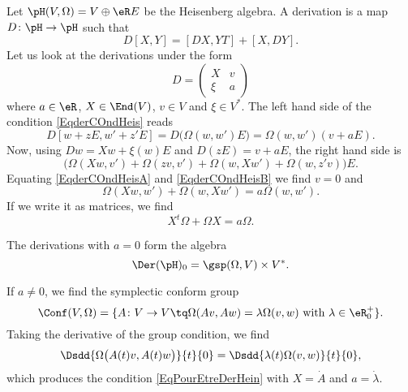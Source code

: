 Let $\pH(V,\Omega)=V\oplus\eR E$ be the Heisenberg algebra. A derivation is a map $D\colon \pH \to \pH$ such that
\begin{equation}        \label{EqderCOndHeis}
    D[X,Y]=[DX,YT]+[X,DY].
\end{equation}
Let us look at the derivations under the form
\begin{equation}
    D=\begin{pmatrix}
        X   &   v   \\ 
        \xi &   a   
    \end{pmatrix}
\end{equation}
where $a\in\eR$, $X\in\End(V)$, $v\in V$ and $\xi\in V^*$. The left hand side of the condition \eqref{EqderCOndHeis} reads
\begin{equation}    \label{EqderCOndHeisA}
    D[w+zE,w'+z'E]=D\big( \Omega(w,w')E \big)=\Omega(w,w')(v+aE).
\end{equation}
Now, using $Dw=Xw+\xi(w)E$ and $D(zE)=v+aE$, the right hand side is
\begin{equation}    \label{EqderCOndHeisB}
    \big( \Omega(Xw,v')+\Omega(zv,v')+\Omega(w,Xw')+\Omega(w,z'v) \big)E.
\end{equation}
Equating \eqref{EqderCOndHeisA} and \eqref{EqderCOndHeisB} we find $v=0$ and 
\begin{equation}        \label{EqPourEtreDerHein}
    \Omega(Xw,w')+\Omega(w,Xw')=a\Omega(w,w').
\end{equation}
If we write it as matrices, we find
\begin{equation}
    X^t\Omega+\Omega X=a\Omega.
\end{equation}

The derivations with $a=0$ form the algebra
\begin{equation}
    \Der(\pH)_0=\gsp(\Omega,V)\times V^*.
\end{equation}

If $a\neq 0$, we find the symplectic conform group
\begin{equation}
    \Conf(V,\Omega)=\{ A\colon V\to V\tq \Omega(Av,Aw)=\lambda\Omega(v,w)\text{ with }\lambda\in\eR_0^+ \}.
\end{equation}
Taking the derivative of the group condition, we find
\begin{equation}
    \Dsdd{ \Omega\big( A(t)v,A(t)w \big) }{t}{0}=\Dsdd{ \lambda(t)\Omega(v,w) }{t}{0},
\end{equation}
which produces the condition \eqref{EqPourEtreDerHein} with $X=\dot A$ and $a=\dot \lambda$.

